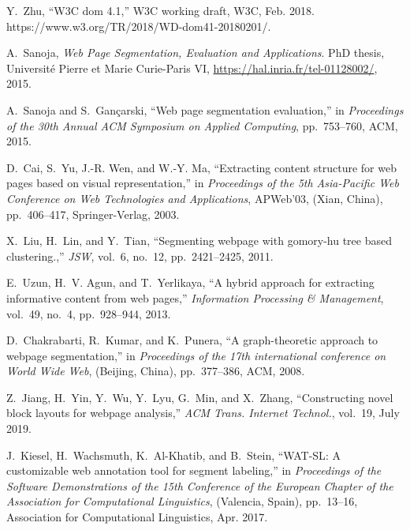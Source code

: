 \documentclass[10pt]{revecom}
\begin{document}

\begin{thebibliography}{10}

Y.~Zhu, ``{W3C} dom {4.1},'' {W3C} working draft, W3C, Feb. 2018.
\newblock https://www.w3.org/TR/2018/WD-dom41-20180201/.

A.~Sanoja, {\em Web Page Segmentation, Evaluation and Applications}.
\newblock PhD thesis, Universit{\'e} Pierre et Marie Curie-Paris VI,
  {\url{https://hal.inria.fr/tel-01128002/}}, 2015.

A.~Sanoja and S.~Gan{\c{c}}arski, ``Web page segmentation evaluation,'' in {\em
  Proceedings of the 30th Annual ACM Symposium on Applied Computing},
  pp.~753--760, ACM, 2015.

D.~Cai, S.~Yu, J.-R. Wen, and W.-Y. Ma, ``Extracting content structure for web
  pages based on visual representation,'' in {\em Proceedings of the 5th
  Asia-Pacific Web Conference on Web Technologies and Applications}, APWeb'03,
  (Xian, China), pp.~406--417, Springer-Verlag, 2003.

X.~Liu, H.~Lin, and Y.~Tian, ``Segmenting webpage with gomory-hu tree based
  clustering.,'' {\em JSW}, vol.~6, no.~12, pp.~2421--2425, 2011.

E.~Uzun, H.~V. Agun, and T.~Yerlikaya, ``A hybrid approach for extracting
  informative content from web pages,'' {\em Information Processing \&
  Management}, vol.~49, no.~4, pp.~928--944, 2013.

D.~Chakrabarti, R.~Kumar, and K.~Punera, ``A graph-theoretic approach to
  webpage segmentation,'' in {\em Proceedings of the 17th international
  conference on World Wide Web}, (Beijing, China), pp.~377--386, ACM, 2008.

Z.~Jiang, H.~Yin, Y.~Wu, Y.~Lyu, G.~Min, and X.~Zhang, ``Constructing novel
  block layouts for webpage analysis,'' {\em ACM Trans. Internet Technol.},
  vol.~19, July 2019.

J.~Kiesel, H.~Wachsmuth, K.~Al-Khatib, and B.~Stein, ``{WAT}-{SL}: A
  customizable web annotation tool for segment labeling,'' in {\em Proceedings
  of the Software Demonstrations of the 15th Conference of the {E}uropean
  Chapter of the Association for Computational Linguistics}, (Valencia, Spain),
  pp.~13--16, Association for Computational Linguistics, Apr. 2017.


\end{thebibliography}
\end{document}
